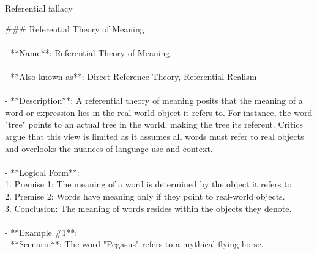\documentclass[a4paper,12pt,single,pdftex]{scrbook}
\begin{document}
  

Referential fallacy
    
      \#\#\# Referential Theory of Meaning
    \\

    
      
    \\

    
      - **Name**: Referential Theory of Meaning
    \\

    
      
    \\

    
      - **Also known as**: Direct Reference Theory, Referential Realism
    \\

    
      
    \\

    
      - **Description**: A referential theory of meaning posits that the meaning of a word or expression lies in the real-world object it refers to. For instance, the word "tree" points to an actual tree in the world, making the tree its referent. Critics argue that this view is limited as it assumes all words must refer to real objects and overlooks the nuances of language use and context.
    \\

    
      
    \\

    
      - **Logical Form**:
    \\

    
        1. Premise 1: The meaning of a word is determined by the object it refers to.
    \\

    
        2. Premise 2: Words have meaning only if they point to real-world objects.
    \\

    
        3. Conclusion: The meaning of words resides within the objects they denote.
    \\

    
      
    \\

    
      - **Example \#1**:
    \\

    
        - **Scenario**: The word "Pegasus" refers to a mythical flying horse.
    \\
\end{document}
